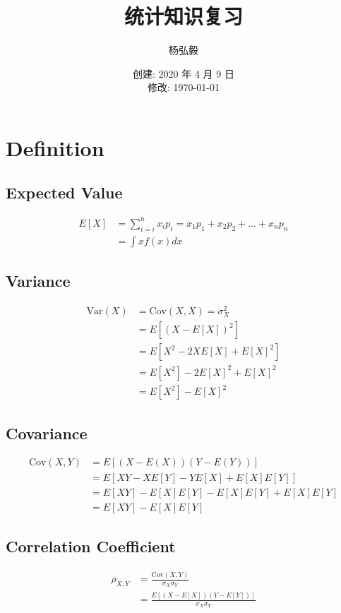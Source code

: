 \documentclass[11pt]{article}
\title{统计知识复习}
\author{杨弘毅}
\date{创建: 2020 年 4 月 9 日 \\修改: \today}
\begin{document}
\maketitle

\section{Definition}

\subsection*{Expected Value}
\noindent
\begin{align*}
    E[X] &= \sum_{i=i}^n x_i p_i =x_1 p_1 + x_2 p_2 + \dots + x_n p_n \\
    &= \int x f(x) dx
\end{align*}

\subsection*{Variance}
\noindent
\begin{align*}
\text{Var}(X) &= \text{Cov}(X,X) = \sigma_X^2\\ 
&= E[(X-E[X])^2] \\
&= E[X^2 - 2XE[X] + E[X]^2] \\
&= E[X^2] - 2E[X]^2 + E[X]^2 \\
&= E[X^2] - E[X]^2
\end{align*}

\subsection*{Covariance}
\noindent
\begin{align*}
\text{Cov}(X,Y) &= E[(X-E(X))(Y-E(Y))] \\
&= E[XY - XE[Y] -YE[X]+ E[X]E[Y]] \\
&= E[XY] - E[X]E[Y] - E[X]E[Y] + E[X]E[Y] \\
&= E[XY] - E[X]E[Y]
\end{align*}

\subsection*{Correlation Coefficient}
\noindent
\begin{align*}
\rho_{X,Y} &= \frac{\text{Cov}(X,Y)}{\sigma_X\sigma_Y} \\
&= \frac{E[(X-E[X])(Y-E[Y])]}{\sigma_X\sigma_Y}
\end{align*}
\end{document}
